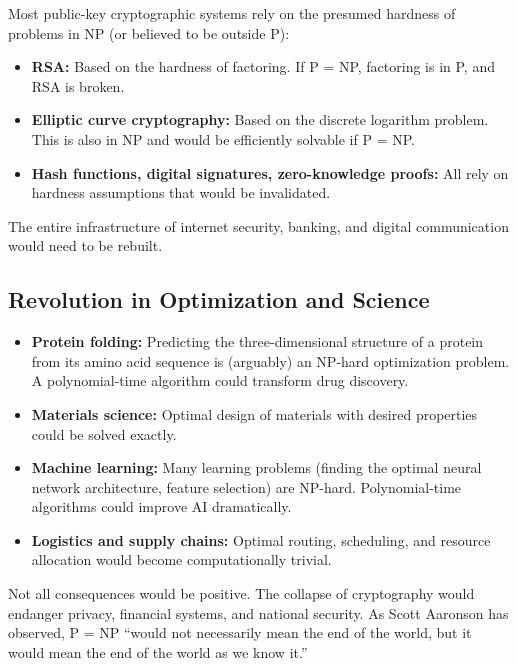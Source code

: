 Most public-key cryptographic systems rely on the presumed hardness of problems in NP (or believed to be outside P):
\begin{itemize}
  \item \textbf{RSA:} Based on the hardness of factoring. If P = NP, factoring is in P, and RSA is broken.
  \item \textbf{Elliptic curve cryptography:} Based on the discrete logarithm problem. This is also in NP and would be efficiently solvable if P = NP.
  \item \textbf{Hash functions, digital signatures, zero-knowledge proofs:} All rely on hardness assumptions that would be invalidated.
\end{itemize}

The entire infrastructure of internet security, banking, and digital communication would need to be rebuilt.

\subsection{Revolution in Optimization and Science}

\begin{itemize}
  \item \textbf{Protein folding:} Predicting the three-dimensional structure of a protein from its amino acid sequence is (arguably) an NP-hard optimization problem. A polynomial-time algorithm could transform drug discovery.
  \item \textbf{Materials science:} Optimal design of materials with desired properties could be solved exactly.
  \item \textbf{Machine learning:} Many learning problems (finding the optimal neural network architecture, feature selection) are NP-hard. Polynomial-time algorithms could improve AI dramatically.
  \item \textbf{Logistics and supply chains:} Optimal routing, scheduling, and resource allocation would become computationally trivial.
\end{itemize}

\begin{remark}
Not all consequences would be positive. The collapse of cryptography would endanger privacy, financial systems, and national security. As Scott Aaronson has observed, P = NP ``would not necessarily mean the end of the world, but it would mean the end of the world as we know it.''
\end{remark}

